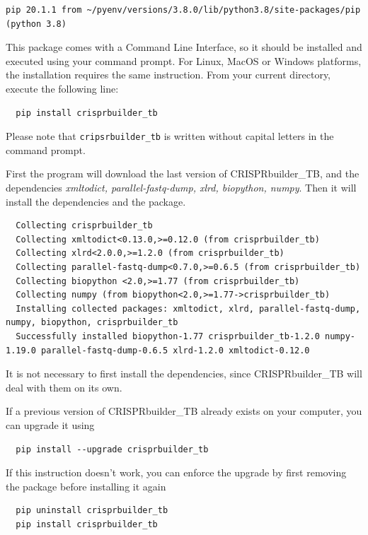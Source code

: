 \documentclass[twoside,a4paper,11pt,frenchb,openany]{report}
\begin{document}
\begin{verbatim}
pip 20.1.1 from ~/pyenv/versions/3.8.0/lib/python3.8/site-packages/pip (python 3.8)
\end{verbatim}

    This package comes with a Command Line Interface, so it should be
installed and executed using your command prompt. For Linux, MacOS or
Windows platforms, the installation requires the same instruction. From your current directory, execute the following line:

    \begin{verbatim}
  pip install crisprbuilder_tb
\end{verbatim}

    Please note that \texttt{cripsrbuilder\_tb} is written without capital
letters in the command prompt.

First the program will download the last version of CRISPRbuilder\_TB, and the dependencies \textit{xmltodict, parallel-fastq-dump, xlrd, biopython, numpy}. Then it will install the dependencies and the package.

\begin{verbatim}  Collecting crisprbuilder_tb
  Collecting xmltodict<0.13.0,>=0.12.0 (from crisprbuilder_tb)
  Collecting xlrd<2.0.0,>=1.2.0 (from crisprbuilder_tb)
  Collecting parallel-fastq-dump<0.7.0,>=0.6.5 (from crisprbuilder_tb)
  Collecting biopython <2.0,>=1.77 (from crisprbuilder_tb)
  Collecting numpy (from biopython<2.0,>=1.77->crisprbuilder_tb)
  Installing collected packages: xmltodict, xlrd, parallel-fastq-dump, numpy, biopython, crisprbuilder_tb
  Successfully installed biopython-1.77 crisprbuilder_tb-1.2.0 numpy-1.19.0 parallel-fastq-dump-0.6.5 xlrd-1.2.0 xmltodict-0.12.0
\end{verbatim}

 It is not necessary to first install the dependencies, since CRISPRbuilder\_TB will deal with them on its own.

If a previous version of CRISPRbuilder\_TB already exists on your computer, you can upgrade it using 

\begin{verbatim}
  pip install --upgrade crisprbuilder_tb
\end{verbatim}

If this instruction doesn't work, you can enforce the upgrade by first removing the package before installing it again

\begin{verbatim}
  pip uninstall crisprbuilder_tb
  pip install crisprbuilder_tb
\end{verbatim}
\end{document}
